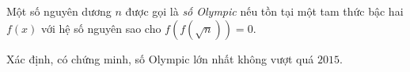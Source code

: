 \ifshowproblem
\begin{problem}\label{example:RUS-2015-SMO-10-P4}
    Một số nguyên dương \( n \) được gọi là \textit{số Olympic} nếu tồn tại một tam thức bậc hai \( f(x) \) với hệ số nguyên 
    sao cho \( f(f(\sqrt{n})) = 0 \).
    
    Xác định, có chứng minh, số Olympic lớn nhất không vượt quá \( 2015 \).
\end{problem}
\fi

\footnotemark
{}
\fi